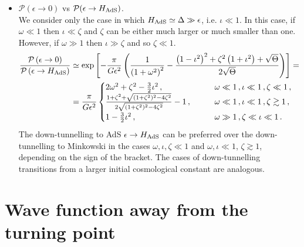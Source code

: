 \documentclass[11pt,a4paper]{article}
\begin{document}
\begin{itemize}
\item $\mathcal{P}(\epsilon \rightarrow 0)$ vs $\mathcal{P}(\epsilon \rightarrow H_{\rm AdS})$.\\
We consider only the case in which $H_{\rm AdS} \simeq \Delta \gg \epsilon$, i.e. $\iota \ll 1$. In this case, if $\omega \ll 1$ then $\iota \ll \zeta$ and $\zeta$ can be either much larger or much smaller than one. However, if $\omega \gg 1$ then $\iota \gg \zeta$ and so $\zeta \ll 1$.
\begin{align}
\frac{\mathcal{P}\left(\epsilon \rightarrow 0\right)}{\mathcal{P}\left(\epsilon \rightarrow H_{\rm AdS}\right)} &\simeq \exp\left[- \frac{\pi}{G \epsilon^2} \left(\frac{1}{\left(1 + \omega^2\right)^2} - \frac{\left(1 - \iota^2\right)^2 + \zeta^2 \left(1 + \iota^2\right) + \sqrt{\Theta}}{2 \sqrt{\Theta}}\right) \right] = \, \nonumber \\
& = \frac{\pi}{G \epsilon^2} \begin{cases}
2 \omega^2 + \zeta^2 - \frac{3}{2} \iota^2 \,, \qquad &\omega \ll 1 \,, \iota \ll 1 \,, \zeta \ll 1 \,, \\
\frac{1 + \zeta^2 + \sqrt{(1 + \zeta^2)^2 - 4 \zeta^2}}{2 \sqrt{(1 + \zeta^2)^2 - 4 \zeta^2}} - 1\,, \qquad & \omega \ll 1 \,, \iota \ll 1 \,, \zeta \gtrsim 1 \,, \\
1 - \frac{3}{2} \iota^2 \,, \qquad & \omega \gg 1 \,, \zeta \ll \iota \ll 1 \,. \\
\end{cases}
\end{align}
The down-tunnelling to AdS $\epsilon \rightarrow H_{\rm AdS}$ can be preferred over the down-tunnelling to Minkowski in the cases $\omega, \iota, \zeta \ll 1$ and $\omega, \iota \ll 1$, $\zeta \gtrsim 1$, depending on the sign of the bracket. The cases of down-tunnelling transitions from a larger initial cosmological constant are analogous.
\end{itemize}



\section{Wave function away from the turning point\label{sec:Wave-function-away}}
\end{document}

